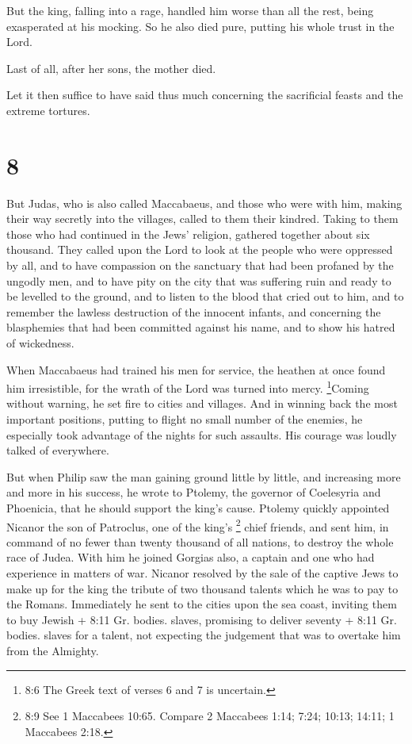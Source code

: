 But the king, falling into a rage, handled him worse than
all the rest, being exasperated at his mocking.  So he also
died pure, putting his whole trust in the Lord.

 Last of all, after her sons, the mother died.

 Let it then suffice to have said thus much concerning the
sacrificial feasts and the extreme tortures.

\hypertarget{section-6}{%
\section{8}\label{section-6}}

 But Judas, who is also called Maccabaeus, and those who
were with him, making their way secretly into the villages, called to
them their kindred. Taking to them those who had continued in the Jews'
religion, gathered together about six thousand.  They called
upon the Lord to look at the people who were oppressed by all, and to
have compassion on the sanctuary that had been profaned by the ungodly
men,  and to have pity on the city that was suffering ruin
and ready to be levelled to the ground, and to listen to the blood that
cried out to him,  and to remember the lawless destruction
of the innocent infants, and concerning the blasphemies that had been
committed against his name, and to show his hatred of wickedness.

 When Maccabaeus had trained his men for service, the
heathen at once found him irresistible, for the wrath of the Lord was
turned into mercy.  \footnote{8:6 The Greek text of verses 6
  and 7 is uncertain.}Coming without warning, he set fire to cities and
villages. And in winning back the most important positions, putting to
flight no small number of the enemies,  he especially took
advantage of the nights for such assaults. His courage was loudly talked
of everywhere.

 But when Philip saw the man gaining ground little by
little, and increasing more and more in his success, he wrote to
Ptolemy, the governor of Coelesyria and Phoenicia, that he should
support the king's cause.  Ptolemy quickly appointed Nicanor
the son of Patroclus, one of the king's \footnote{8:9 See 1 Maccabees
  10:65. Compare 2 Maccabees 1:14; 7:24; 10:13; 14:11; 1 Maccabees 2:18.}
chief friends, and sent him, in command of no fewer than twenty thousand
of all nations, to destroy the whole race of Judea. With him he joined
Gorgias also, a captain and one who had experience in matters of war.
 Nicanor resolved by the sale of the captive Jews to make
up for the king the tribute of two thousand talents which he was to pay
to the Romans.  Immediately he sent to the cities upon the
sea coast, inviting them to buy Jewish + 8:11 Gr. bodies. slaves,
promising to deliver seventy + 8:11 Gr. bodies. slaves for a talent, not
expecting the judgement that was to overtake him from the Almighty.

